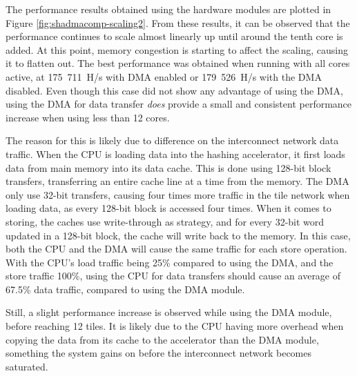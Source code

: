 The performance results obtained using the hardware modules are plotted in Figure \ref{fig:shadmacomp-scaling2}.
From these results, it can be observed that the performance continues to scale almost linearly up until around
the tenth core is added. At this point, memory congestion is starting to affect the scaling, causing it to
flatten out. The best performance was obtained when running with all cores active, at 175~711~H/s with DMA
enabled or 179~526~H/s with the DMA disabled. Even though this case did not show any advantage of using the
DMA, using the DMA for data transfer \emph{does} provide a small and consistent performance increase when using less than 
12 cores.

The reason for this is likely due to difference on the interconnect network data traffic. 
When the CPU is loading data into the hashing accelerator, it first loads data from main memory into its data cache. 
This is done using 128-bit block transfers, transferring an entire cache line at a time from the memory.
The DMA only use 32-bit transfers, causing four times more traffic in the tile network when loading data, as every 128-bit block is accessed four times.
When it comes to storing, the caches use write-through as strategy, and for every 32-bit word updated in a 128-bit block, the cache will write back to the memory.
In this case, both the CPU and the DMA will cause the same traffic for each store operation.
With the CPU's load traffic being 25\% compared to using the DMA, and the store traffic 100\%, using the CPU for data transfers should cause an average of 67.5\% data traffic, compared to using the DMA module.

Still, a slight performance increase is observed while using the DMA module, before reaching 12 tiles. 
It is likely due to the CPU having more overhead when copying the data from its cache to the accelerator than the DMA module, something the system gains on before the interconnect network becomes saturated. 

